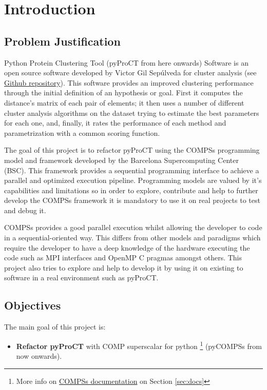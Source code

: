 \chapter{Introduction}

\section{Problem Justification}

Python Protein Clustering Tool (pyProCT from here onwards) Software is an open source software developed by Victor Gil Sepúlveda for cluster analysis (see \hyperref[sec:docs]{Github repository}). This software provides an improved clustering performance through the initial definition of an hypothesis or goal. First it computes the distance's matrix of each pair of elements; it then uses a number of different cluster analysis algorithms on the dataset trying to estimate the best parameters for each one, and, finally, it rates the performance of each method and parametrization with a common scoring function.

The goal of this project is to refactor pyProCT using the COMPSs programming model and framework developed by the Barcelona Supercomputing Center (BSC). This framework provides a sequential programming interface to achieve a parallel and optimized execution pipeline. Programming models are valued by it's capabilities and limitations so in order to explore, contribute and help to further develop the COMPSs framework it is mandatory to use it on real projects to test and debug it.

COMPSs provides a good parallel execution whilst allowing the developer to code in a sequential-oriented way. This differs from other models and paradigms which require the developer to have a deep knowledge of the hardware executing the code such as MPI interfaces and OpenMP C pragmas amongst others. This project also tries to explore and help to develop it by using it on existing to software in a real environment such as pyProCT.



\section{Objectives}

The main goal of this project is:
\begin{itemize}
\item \textbf{Refactor pyProCT} with COMP superscalar for python \footnote{ More info on \hyperref[subsec:compss_doc]{COMPSs documentation} on Section \ref{sec:docs}} (pyCOMPSs from now onwards). 
\end{itemize}

